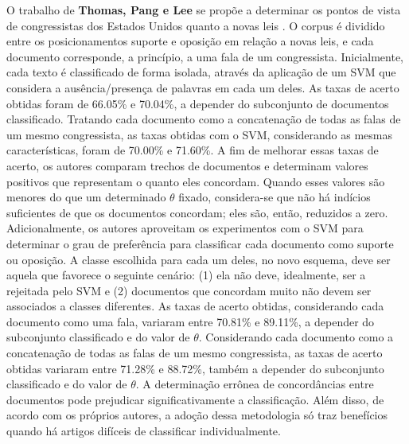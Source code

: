 O trabalho de \textbf{Thomas, Pang e Lee} se propõe a determinar os pontos de vista de congressistas dos Estados Unidos quanto a novas leis \cite{get-out-the-vote}. O corpus é dividido entre os posicionamentos suporte e oposição em relação a novas leis, e cada documento corresponde, a princípio, a uma fala de um congressista. Inicialmente, cada texto é classificado de forma isolada, através da aplicação de um SVM que considera a ausência/presença de palavras em cada um deles. As taxas de acerto obtidas foram de 66.05\% e 70.04\%, a depender do subconjunto de documentos classificado. Tratando cada documento como a concatenação de todas as falas de um mesmo congressista, as taxas obtidas com o SVM, considerando as mesmas características, foram de 70.00\% e 71.60\%. A fim de melhorar essas taxas de acerto, os autores comparam trechos de documentos e determinam valores positivos que representam o quanto eles concordam. Quando esses valores são menores do que um determinado \ensuremath{\theta} fixado, considera-se que não há indícios suficientes de que os documentos concordam; eles são, então, reduzidos a zero. Adicionalmente, os autores aproveitam os experimentos com o SVM para determinar o grau de preferência para classificar cada documento como suporte ou oposição. A classe escolhida para cada um deles, no novo esquema, deve ser aquela que favorece o seguinte cenário: (1) ela não deve, idealmente, ser a rejeitada pelo SVM e (2) documentos que concordam muito não devem ser associados a classes diferentes. As taxas de acerto obtidas, considerando cada documento como uma fala, variaram entre 70.81\% e 89.11\%, a depender do subconjunto classificado e do valor de \ensuremath{\theta}. Considerando cada documento como a concatenação de todas as falas de um mesmo congressista, as taxas de acerto obtidas variaram entre 71.28\% e 88.72\%, também a depender do subconjunto classificado e do valor de \ensuremath{\theta}. A determinação errônea de concordâncias entre documentos pode prejudicar significativamente a classificação. Além disso, de acordo com os próprios autores, a adoção dessa metodologia só traz benefícios quando há artigos difíceis de classificar individualmente.    

